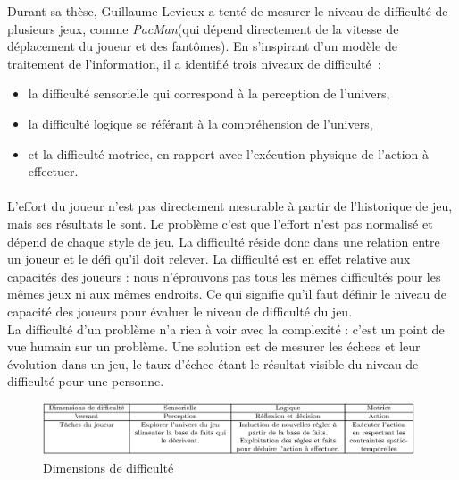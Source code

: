 Durant sa thèse, Guillaume Levieux\cite{Levi11} a tenté de mesurer le niveau de difficulté de plusieurs jeux, comme \emph{PacMan}(qui dépend directement de la vitesse de déplacement du joueur et des fantômes). En s’inspirant d’un modèle de traitement de l’information, il a identifié trois niveaux de difficulté~:
	\begin{itemize}
		\item la difficulté sensorielle qui correspond à la perception de l’univers,
		\item la difficulté logique se référant à la compréhension de l’univers,
		\item et la difficulté motrice, en rapport avec l'exécution physique de l’action à effectuer.
\end{itemize}
\paragraph{}L’effort du joueur n’est pas directement mesurable à partir de l’historique de jeu, mais ses résultats le sont. Le problème c’est que l’effort n’est pas normalisé et dépend de chaque style de jeu. La difficulté réside donc dans une relation entre un joueur et le défi qu’il doit relever. La difficulté est en effet relative aux capacités des joueurs : nous n’éprouvons pas tous les mêmes difficultés pour les mêmes jeux ni aux mêmes endroits. Ce qui signifie qu’il faut définir le niveau de capacité des joueurs pour évaluer le niveau de difficulté du jeu.\\
La difficulté d’un problème n’a rien à voir avec la complexité : c’est un point de vue humain sur un problème. Une solution est de mesurer les échecs et leur évolution dans un jeu, le taux d’échec étant le résultat visible du niveau de difficulté pour une personne.

\begin{figure}[!hb]
	\centering
	\includegraphics[width=11cm]{images/dimensions_difficulte.png}
	\caption{Dimensions de difficulté}
	\label{dimensions_difficulte}
\end{figure}

